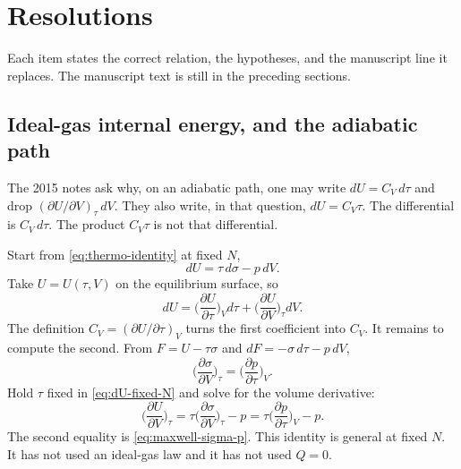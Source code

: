 \section{Resolutions}
\label{sec:resolutions}

Each item states the correct relation, the hypotheses, and the manuscript line it replaces. The manuscript text is still in the preceding sections.

\subsection{Ideal-gas internal energy, and the adiabatic path}
\label{sec:adiabatic-question}

The 2015 notes ask why, on an adiabatic path, one may write \(dU = C_V\, d\tau\) and drop \((\partial U/\partial V)_{\tau}\, dV\). They also write, in that question, \(dU = C_V\tau\). The differential is \(C_V\, d\tau\). The product \(C_V\tau\) is not that differential.

Start from \eqref{eq:thermo-identity} at fixed \(N\),
\begin{equation}
\label{eq:dU-fixed-N}
dU = \tau\, d\sigma - p\, dV.
\end{equation}
Take \(U = U(\tau,V)\) on the equilibrium surface, so
\begin{equation}
\label{eq:dU-tau-V}
dU
= \biggl(\frac{\partial U}{\partial\tau}\biggr)_{V} d\tau
+ \biggl(\frac{\partial U}{\partial V}\biggr)_{\tau} dV.
\end{equation}
The definition \(C_V = (\partial U/\partial\tau)_{V}\) turns the first coefficient into \(C_V\). It remains to compute the second. From \(F = U - \tau\sigma\) and \(dF = -\sigma\, d\tau - p\, dV\),
\begin{equation}
\label{eq:maxwell-sigma-p}
\biggl(\frac{\partial\sigma}{\partial V}\biggr)_{\tau}
= \biggl(\frac{\partial p}{\partial\tau}\biggr)_{V}.
\end{equation}
Hold \(\tau\) fixed in \eqref{eq:dU-fixed-N} and solve for the volume derivative:
\begin{equation}
\label{eq:dU-dV}
\biggl(\frac{\partial U}{\partial V}\biggr)_{\tau}
= \tau\biggl(\frac{\partial\sigma}{\partial V}\biggr)_{\tau} - p
= \tau\biggl(\frac{\partial p}{\partial\tau}\biggr)_{V} - p.
\end{equation}
The second equality is \eqref{eq:maxwell-sigma-p}. This identity is general at fixed \(N\). It has not used an ideal-gas law and it has not used \(Q=0\).

